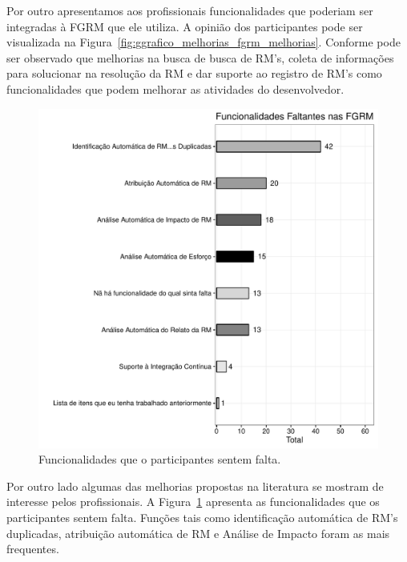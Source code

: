 Por outro apresentamos aos profissionais funcionalidades que poderiam ser
integradas à FGRM que ele utiliza. A opinião dos participantes pode ser
visualizada na Figura~\ref{fig:ggrafico_melhorias_fgrm_melhorias}. Conforme pode
ser observado que melhorias na busca de busca de RM's, coleta de informações
para solucionar na resolução da RM e dar suporte ao registro de RM's como
funcionalidades que podem melhorar as atividades do desenvolvedor.

\begin{figure}[htpb]
	\centering
	\includegraphics[width=0.8\linewidth]{./chapter-pesquisa-com-profissionais/img/grafico_melhorias_fgrm_funcionalidades_faltantes.pdf}
	\caption{Funcionalidades que o participantes sentem falta.}
	\label{fig:grafico_melhorias_fgrm_funcionalidades_falantes}
\end{figure}

Por outro lado algumas das melhorias propostas na literatura se mostram de
interesse pelos profissionais. A
Figura~\ref{fig:grafico_melhorias_fgrm_funcionalidades_falantes} apresenta as
funcionalidades que os participantes sentem falta. Funções tais como
identificação automática de RM's duplicadas, atribuição automática de RM e
Análise de Impacto foram as mais frequentes. 

